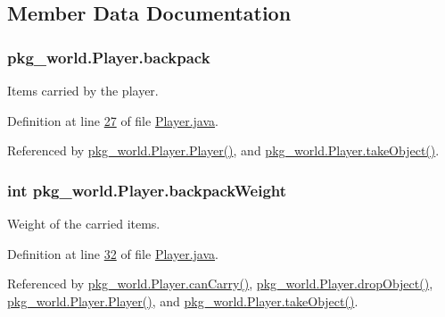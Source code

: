 \subsection{Member Data Documentation}
\hypertarget{classpkg__world_1_1Player_adea3925e7f823a9602e5f9ee58683e3b}{
\subsubsection[{backpack}]{ pkg\-\_\-world.\-Player.\-backpack\hspace{0.3cm}{\ttfamily [private]}}}\label{classpkg__world_1_1Player_adea3925e7f823a9602e5f9ee58683e3b}


Items carried by the player. 



Definition at line \hyperlink{Player_8java_source_l00027}{27} of file \hyperlink{Player_8java_source}{Player.\-java}.



Referenced by \hyperlink{Player_8java_source_l00059}{pkg\-\_\-world.\-Player.\-Player()}, and \hyperlink{Player_8java_source_l00192}{pkg\-\_\-world.\-Player.\-take\-Object()}.

\hypertarget{classpkg__world_1_1Player_a19ed9d4d1b17f409f106142ec2fd68a3}{
\subsubsection[{backpack\-Weight}]{\setlength{\rightskip}{0pt plus 5cm}int pkg\-\_\-world.\-Player.\-backpack\-Weight\hspace{0.3cm}{\ttfamily [private]}}}\label{classpkg__world_1_1Player_a19ed9d4d1b17f409f106142ec2fd68a3}


Weight of the carried items. 



Definition at line \hyperlink{Player_8java_source_l00032}{32} of file \hyperlink{Player_8java_source}{Player.\-java}.



Referenced by \hyperlink{Player_8java_source_l00184}{pkg\-\_\-world.\-Player.\-can\-Carry()}, \hyperlink{Player_8java_source_l00201}{pkg\-\_\-world.\-Player.\-drop\-Object()}, \hyperlink{Player_8java_source_l00059}{pkg\-\_\-world.\-Player.\-Player()}, and \hyperlink{Player_8java_source_l00192}{pkg\-\_\-world.\-Player.\-take\-Object()}.

